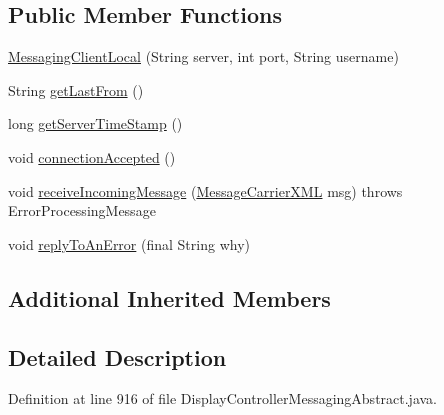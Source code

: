 \subsection*{Public Member Functions}
\begin{DoxyCompactItemize}
\item 
\hyperlink{classgov_1_1fnal_1_1ppd_1_1dd_1_1display_1_1client_1_1DisplayControllerMessagingAbstract_1_1MessagingClientLocal_aab5055217ae02ff553cf3e5f084a607e}{Messaging\-Client\-Local} (String server, int port, String username)
\item 
String \hyperlink{classgov_1_1fnal_1_1ppd_1_1dd_1_1display_1_1client_1_1DisplayControllerMessagingAbstract_1_1MessagingClientLocal_a9a193015aabc39d3b5492b0c337b4376}{get\-Last\-From} ()
\item 
long \hyperlink{classgov_1_1fnal_1_1ppd_1_1dd_1_1display_1_1client_1_1DisplayControllerMessagingAbstract_1_1MessagingClientLocal_a767cb79358df8e50da15ad8f6cc00cf4}{get\-Server\-Time\-Stamp} ()
\item 
void \hyperlink{classgov_1_1fnal_1_1ppd_1_1dd_1_1display_1_1client_1_1DisplayControllerMessagingAbstract_1_1MessagingClientLocal_abcadb8c8fa8f72b2f6a03e486e1a8dc3}{connection\-Accepted} ()
\item 
void \hyperlink{classgov_1_1fnal_1_1ppd_1_1dd_1_1display_1_1client_1_1DisplayControllerMessagingAbstract_1_1MessagingClientLocal_a259fb401595d4b323303f6d03746467f}{receive\-Incoming\-Message} (\hyperlink{classgov_1_1fnal_1_1ppd_1_1dd_1_1xml_1_1MessageCarrierXML}{Message\-Carrier\-X\-M\-L} msg)  throws Error\-Processing\-Message 
\item 
void \hyperlink{classgov_1_1fnal_1_1ppd_1_1dd_1_1display_1_1client_1_1DisplayControllerMessagingAbstract_1_1MessagingClientLocal_a4d746696e272fa4253a59369f434eb92}{reply\-To\-An\-Error} (final String why)
\end{DoxyCompactItemize}
\subsection*{Additional Inherited Members}


\subsection{Detailed Description}


Definition at line 916 of file Display\-Controller\-Messaging\-Abstract.\-java.



